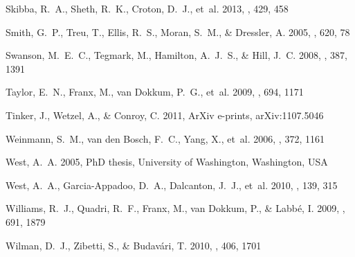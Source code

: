 \documentclass{emulateapj}
\begin{document}
\begin{thebibliography}{}
{Skibba}, R.~A., {Sheth}, R.~K., {Croton}, D.~J., {et~al.} 2013, \mnras, 429,
  458

{Smith}, G.~P., {Treu}, T., {Ellis}, R.~S., {Moran}, S.~M., \& {Dressler}, A.
  2005, \apj, 620, 78

{Swanson}, M.~E.~C., {Tegmark}, M., {Hamilton}, A.~J.~S., \& {Hill}, J.~C.
  2008, \mnras, 387, 1391

{Taylor}, E.~N., {Franx}, M., {van Dokkum}, P.~G., {et~al.} 2009, \apj, 694,
  1171

{Tinker}, J., {Wetzel}, A., \& {Conroy}, C. 2011, ArXiv e-prints,
  arXiv:1107.5046

{Weinmann}, S.~M., {van den Bosch}, F.~C., {Yang}, X., {et~al.} 2006, \mnras,
  372, 1161

{West}, A.~A. 2005, PhD thesis, University of Washington, Washington, USA

{West}, A.~A., {Garcia-Appadoo}, D.~A., {Dalcanton}, J.~J., {et~al.} 2010,
  \apj, 139, 315

{Williams}, R.~J., {Quadri}, R.~F., {Franx}, M., {van Dokkum}, P., \&
  {Labb{\'e}}, I. 2009, \apj, 691, 1879

{Wilman}, D.~J., {Zibetti}, S., \& {Budav{\'a}ri}, T. 2010, \mnras, 406, 1701


\end{thebibliography}
\end{document}
